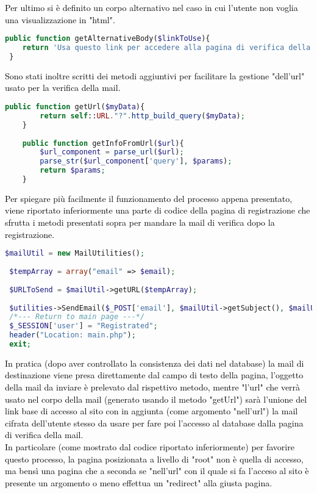  \raggedright
 \textcolor{black}{Per ultimo si è definito un corpo alternativo nel caso in cui l'utente non voglia una visualizzazione in "html".}\\
 
  \begin{lstlisting}[language=php]
 public function getAlternativeBody($linkToUse){
 	return 'Usa questo link per accedere alla pagina di verifica della mail: '.$linkToUse;
 }
  \end{lstlisting}
  
  \raggedright
  \textcolor{black}{Sono stati inoltre scritti dei metodi aggiuntivi per facilitare la gestione  "dell'url" usato per la verifica della mail.}\\
  
 \begin{lstlisting}[language=php]
   	public function getUrl($myData){
   		return self::URL."?".http_build_query($myData);
   	}
   	
   	public function getInfoFromUrl($url){
   		$url_component = parse_url($url);
   		parse_str($url_component['query'], $params);
   		return $params;
   	}
 \end{lstlisting}
 
 \raggedright
 \textcolor{black}{Per spiegare più facilmente il funzionamento del processo appena presentato,  viene riportato inferiormente una parte di codice della pagina di registrazione che sfrutta i metodi presentati sopra per mandare la mail di verifica dopo la registrazione.}\\ 
 
 \begin{lstlisting}[language=php]
 $mailUtil = new MailUtilities();
 
 $tempArray = array("email" => $email);
 
 $URLToSend = $mailUtil->getURL($tempArray);
 
 $utilities->SendEmail($_POST['email'], $mailUtil->getSubject(), $mailUtil->getBody($URLToSend), $mailUtil->getAlternativeBody($URLToSend));
 /*--- Return to main page ---*/
 $_SESSION['user'] = "Registrated";
 header("Location: main.php");
 exit;
  \end{lstlisting}
  
  \raggedright
 \textcolor{black}{ In pratica (dopo aver controllato la consistenza dei dati nel database) la mail di destinazione viene presa direttamente dal campo di testo della pagina, l'oggetto della mail da inviare è prelevato dal rispettivo metodo, mentre "l'url" che verrà usato nel corpo della mail (generato usando il metodo "getUrl") sarà l'unione del link base di accesso al sito con in aggiunta (come argomento "nell'url") la mail cifrata dell'utente stesso da usare per fare poi l'accesso al database dalla pagina di verifica della mail.\\
 In particolare (come mostrato dal codice riportato inferiormente) per favorire questo processo, la pagina posizionata a livello di "root" non è quella di accesso, ma bensì una pagina che a seconda se "nell'url" con il quale si fa l'acceso al sito è presente un argomento o meno effettua un "redirect" alla giusta pagina.}\\
  
